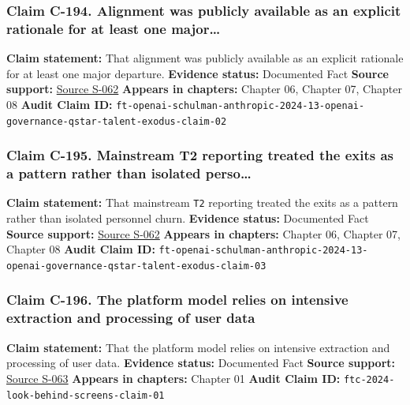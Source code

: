 \documentclass[
  american,
  11pt,
  letterpaper,
]{article}
\begin{document}
\subsubsection{Claim C-194. Alignment was publicly available as an
explicit rationale for at least one
major\ldots{}}\label{claim-c-194-alignment-was-publicly-available-as-an-explicit-rationale-for-at-least-one-major}

\textbf{Claim statement:} That alignment was publicly available as an
explicit rationale for at least one major departure. \textbf{Evidence
status:} Documented Fact \textbf{Source support:}
\hyperref[source-s-062-openai-co-founder-departs-for-rival-anthropic]{Source
S-062} \textbf{Appears in chapters:} Chapter 06, Chapter 07, Chapter 08
\textbf{Audit Claim ID:}
\texttt{ft-openai-schulman-anthropic-2024-13-openai-governance-qstar-talent-exodus-claim-02}

\subsubsection{Claim C-195. Mainstream T2 reporting treated the exits as
a pattern rather than isolated
perso\ldots{}}\label{claim-c-195-mainstream-t2-reporting-treated-the-exits-as-a-pattern-rather-than-isolated-perso}

\textbf{Claim statement:} That mainstream \texttt{T2} reporting treated
the exits as a pattern rather than isolated personnel churn.
\textbf{Evidence status:} Documented Fact \textbf{Source support:}
\hyperref[source-s-062-openai-co-founder-departs-for-rival-anthropic]{Source
S-062} \textbf{Appears in chapters:} Chapter 06, Chapter 07, Chapter 08
\textbf{Audit Claim ID:}
\texttt{ft-openai-schulman-anthropic-2024-13-openai-governance-qstar-talent-exodus-claim-03}

\subsubsection{Claim C-196. The platform model relies on intensive
extraction and processing of user
data}\label{claim-c-196-the-platform-model-relies-on-intensive-extraction-and-processing-of-user-data}

\textbf{Claim statement:} That the platform model relies on intensive
extraction and processing of user data. \textbf{Evidence status:}
Documented Fact \textbf{Source support:}
\hyperref[source-s-063-a-look-behind-the-screens-examining-the-data-practices-of-social-media-and-video-streaming-services]{Source
S-063} \textbf{Appears in chapters:} Chapter 01 \textbf{Audit Claim ID:}
\texttt{ftc-2024-look-behind-screens-claim-01}
\end{document}
